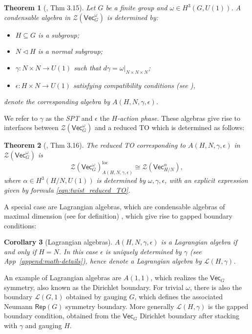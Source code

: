 \documentclass[aps,twocolumn,prx,floatfix,preprintnumbers, nofootinbib,10pt]{revtex4-2}
\numberwithin{equation}{section}
\newtheorem{theorem}{Theorem}[section]
\newtheorem{corollary}[theorem]{Corollary}
\theoremstyle{definition}
\newcommand{\be}{\begin{equation}}
\newcommand{\ee}{\end{equation}}
\newcommand{\cL}{\mathcal{L}}
\newcommand{\cZ}{\mathcal{Z}}
\renewcommand{\Vec}{\mathsf{Vec}}
\newcommand{\Rep}{\mathsf{Rep}}
\newcommand{\eps}{\epsilon}
\begin{document}
\begin{theorem}[\cite{davydov2017lagrangian}, Thm 3.15]
\label{thm:DS-cond-alg}
    Let $G$ be a finite group and $\omega\in H^3(G, U(1))$.
    A condensable algebra in $\cZ(\Vec_G^\omega)$ is determined by:
    \begin{itemize}
    	\item $H\subseteq G$ is a subgroup;
    	\item $N \triangleleft H$ is a normal subgroup;
    	\item $\gamma: N\times N \rightarrow U(1)$ such that $d\gamma = \omega|_{N\times N \times N}$;
    	\item $\epsilon: H\times N \rightarrow U(1)$ satisfying compatibility conditions (see ),
    \end{itemize}
    denote the corresponding algebra by $A(H, N, \gamma, \epsilon)$.
\end{theorem}
We refer to $\gamma$ as the \emph{SPT} and $\eps$ the \emph{$H$-action phase}. These algebras give rise to interfaces between $\cZ (\Vec_G^\omega)$ and a reduced TO which is determined as follows: 
\begin{theorem}[\cite{davydov2017lagrangian}, Thm 3.16]
\label{thm:DS-reducedTO}
    The reduced TO corresponding to $A(H,N,\gamma,\epsilon)$ in $\cZ(\Vec_{G}^{\omega})$ is
    \be \label{eq:RedTO}
\cZ(\Vec_{G}^{\omega})_{A(H,N,\gamma,\epsilon)}^{\text{loc}}\cong \cZ(\Vec_{H/N}^{\alpha}),
    \ee
    where $\alpha \in H^3(H/N, U(1))$ is determined by $\omega,\gamma,\epsilon$, with an explicit expression given by formula \eqref{eqn:twist_reduced_TO}.
\end{theorem}
A special case are Lagrangian algebras, which are condensable algebras of maximal dimension (see  for definition) \cite{davydov2013witt}, which give rise to gapped boundary conditions: 
\begin{corollary}[Lagrangian algebras]
    $A(H,N, \gamma, \epsilon)$ is a Lagrangian algebra if and only if $H=N$. In this case $\epsilon$ is uniquely determined by $\gamma$ (see App~\ref{append:math-details}), hence denote a Lagrangian algebra by $\cL(H,\gamma)$.
\end{corollary}
An example of Lagrangian algebras are  
$A(1,1)$, which realizes the $\Vec_G$ symmetry, also known as the Dirichlet boundary. 
For trivial $\omega$, there is also the boundary $\cL(G,1)$ obtained by gauging $G$, which defines the associated Neumann $\Rep(G)$ symmetry boundary. 
More generally $\cL (H, \gamma)$  is the gapped boundary condition, obtained from the $\Vec_G$ Dirichlet boundary after stacking with $\gamma$ and gauging $H$. 
\end{document}
